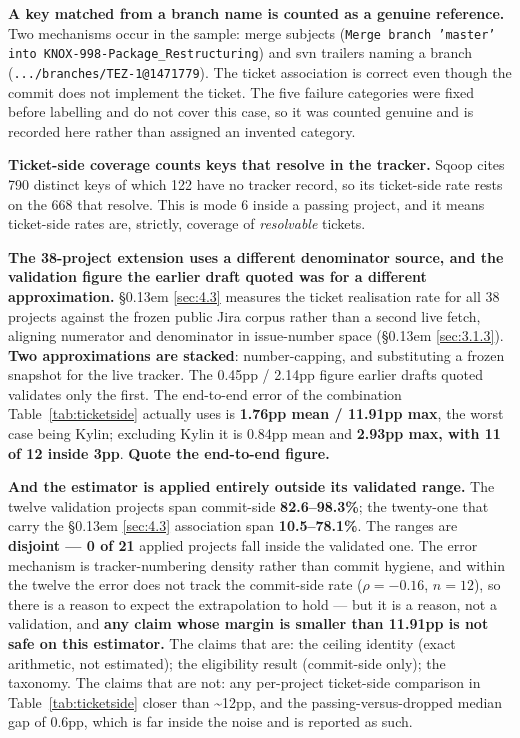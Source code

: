 \documentclass[conference]{IEEEtran}
\begin{document}
\textbf{A key matched from a branch name is counted as a genuine reference.} Two mechanisms occur in the sample: merge subjects (\texttt{Merge branch 'master' into KNOX-\allowbreak{}998-\allowbreak{}Package\_\allowbreak{}Restructuring}) and svn trailers naming a branch (\texttt{.\allowbreak{}.\allowbreak{}.\allowbreak{}/\allowbreak{}branches/\allowbreak{}TEZ-\allowbreak{}1@1471779}). The ticket association is correct even though the commit does not implement the ticket. The five failure categories were fixed before labelling and do not cover this case, so it was counted genuine and is recorded here rather than assigned an invented category.

\textbf{Ticket-side coverage counts keys that resolve in the tracker.} Sqoop cites 790 distinct keys of which 122 have no tracker record, so its ticket-side rate rests on the 668 that resolve. This is mode 6 inside a passing project, and it means ticket-side rates are, strictly, coverage of \emph{resolvable} tickets.

\textbf{The 38-project extension uses a different denominator source, and the validation figure the earlier draft quoted was for a different approximation.} \S\kern0.13em \ref{sec:4.3} measures the ticket realisation rate for all 38 projects against the frozen public Jira corpus rather than a second live fetch, aligning numerator and denominator in issue-number space (\S\kern0.13em \ref{sec:3.1.3}). \textbf{Two approximations are stacked}: number-capping, and substituting a frozen snapshot for the live tracker. The 0.45pp / 2.14pp figure earlier drafts quoted validates only the first. The end-to-end error of the combination Table~\ref{tab:ticketside} actually uses is \textbf{1.76pp mean / 11.91pp max}, the worst case being Kylin; excluding Kylin it is 0.84pp mean and \textbf{2.93pp max, with 11 of 12 inside 3pp}. \textbf{Quote the end-to-end figure.}

\textbf{And the estimator is applied entirely outside its validated range.} The twelve validation projects span commit-side \textbf{82.6--98.3\%}; the twenty-one that carry the \S\kern0.13em \ref{sec:4.3} association span \textbf{10.5--78.1\%}. The ranges are \textbf{disjoint --- 0 of 21} applied projects fall inside the validated one. The error mechanism is tracker-numbering density rather than commit hygiene, and within the twelve the error does not track the commit-side rate ($\rho = -0.16$, $n = 12$), so there is a reason to expect the extrapolation to hold --- but it is a reason, not a validation, and \textbf{any claim whose margin is smaller than 11.91pp is not safe on this estimator.} The claims that are: the ceiling identity (exact arithmetic, not estimated); the eligibility result (commit-side only); the taxonomy. The claims that are not: any per-project ticket-side comparison in Table~\ref{tab:ticketside} closer than \textasciitilde{}12pp, and the passing-versus-dropped median gap of 0.6pp, which is far inside the noise and is reported as such.
\end{document}
